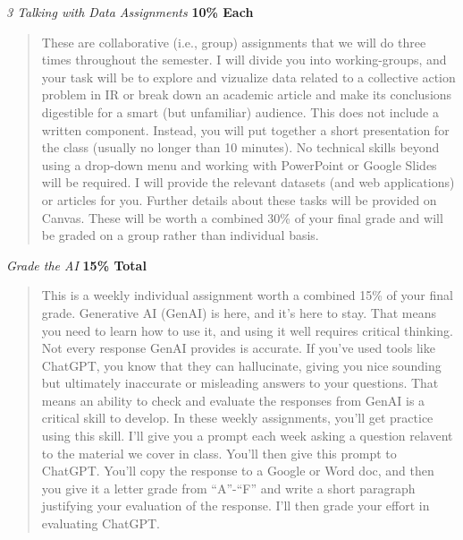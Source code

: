 \documentclass[11pt,]{article}
\begin{document}
\emph{3 Talking with Data Assignments} \textbf{10\% Each}

\begin{quote}
These are collaborative (i.e., group) assignments that we will do three
times throughout the semester. I will divide you into working-groups,
and your task will be to explore and vizualize data related to a
collective action problem in IR or break down an academic article and
make its conclusions digestible for a smart (but unfamiliar) audience.
This does not include a written component. Instead, you will put
together a short presentation for the class (usually no longer than 10
minutes). No technical skills beyond using a drop-down menu and working
with PowerPoint or Google Slides will be required. I will provide the
relevant datasets (and web applications) or articles for you. Further
details about these tasks will be provided on Canvas. These will be
worth a combined 30\% of your final grade and will be graded on a group
rather than individual basis.
\end{quote}

\emph{Grade the AI} \textbf{15\% Total}

\begin{quote}
This is a weekly individual assignment worth a combined 15\% of your
final grade. Generative AI (GenAI) is here, and it's here to stay. That
means you need to learn how to use it, and using it well requires
critical thinking. Not every response GenAI provides is accurate. If
you've used tools like ChatGPT, you know that they can hallucinate,
giving you nice sounding but ultimately inaccurate or misleading answers
to your questions. That means an ability to check and evaluate the
responses from GenAI is a critical skill to develop. In these weekly
assignments, you'll get practice using this skill. I'll give you a
prompt each week asking a question relavent to the material we cover in
class. You'll then give this prompt to ChatGPT. You'll copy the response
to a Google or Word doc, and then you give it a letter grade from
``A''-``F'' and write a short paragraph justifying your evaluation of
the response. I'll then grade your effort in evaluating ChatGPT.
\end{quote}
\end{document}
